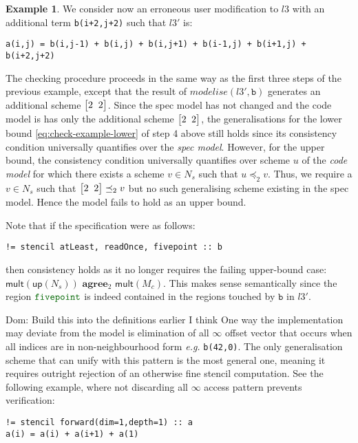 \documentclass[10pt,preprint]{sigplanconf}
\newcommand{\dnote}[1]{\textcolor{darkpurple}{Dom: #1}}
\newcounter{block}
\theoremstyle{definition}
\newtheorem{example}[block]{Example}
\newcommand{\eg}{\emph{e.g.}}
\newcommand{\vtwoh}[2]{\setlength{\arraycolsep}{0em}
\left[\begin{array}{cc}#1 \; & \; #2\end{array}\right]}
\newcommand{\consAName}{\textbf{agree}}
\newcommand{\consSub}[3]{#2 \,\, \consAName{}_{#1} \,\,#3}
\begin{document}
\begin{example}
We consider now an erroneous user modification to $l3$ with an
additional term \texttt{b(i+2,j+2)} such that $l3'$ is:
%
\begin{verbatim}
a(i,j) = b(i,j-1) + b(i,j) + b(i,j+1) + b(i-1,j) + b(i+1,j) + b(i+2,j+2)
\end{verbatim}
%
The checking procedure proceeds in the same way as the first three
steps of the previous example, except that the result of
$\mathit{modelise}(l3',\texttt{b})$ generates an additional scheme
$\vtwoh{2}{2}$. Since the spec model has not changed and the code
model is has only the additional scheme $\vtwoh{2}{2}$, the generalisations for
the lower bound \eqref{eq:check-example-lower}
of step 4 above still holds since its consistency condition
universally quantifies over the \emph{spec model}. However, for
the upper bound, the consistency condition universally quantifies
over scheme $u$ of the \emph{code model} for which there exists
a scheme $v \in N_s$ such that $u \preceq_2 v$. Thus, we require a $v
\in N_s$ such that $\vtwoh{2}{2} \preceq_2 v$ but no such generalising
scheme existing in the spec model. Hence the model fails to hold as an upper bound.

Note that if the specification were as follows:
%
\begin{verbatim}
!= stencil atLeast, readOnce, fivepoint :: b
\end{verbatim}
%
then consistency holds as it no longer requires the failing upper-bound case:
$\consSub{2}{\textsf{mult}(\textsf{up}(N_s))}{\textsf{mult}(M_c)}$.
 This makes sense semantically since the region ${\textcolor{darkgreen}{\texttt{fivepoint}}}$
is indeed contained in the regions touched by $\texttt{b}$ in $l3'$.
\end{example}

\dnote{Build this into the definitions earlier I think}
One way the implementation may deviate from the model is elimination of all $\infty$
offset vector that occurs when all indices are in non-neighbourhood form \eg{}
\texttt{b(42,0)}. The only generalisation scheme that can unify
with this pattern is the most general one, meaning it requires outright
rejection of an otherwise fine stencil computation. See the following example,
where not discarding all $\infty$ access pattern prevents verification:
%
\begin{verbatim}
!= stencil forward(dim=1,depth=1) :: a
a(i) = a(i) + a(i+1) + a(1)
\end{verbatim}
\end{document}

